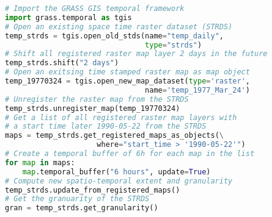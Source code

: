 \documentclass{standalone}
\begin{document}
\begin{lstlisting}[language=Python,linewidth=34.2em]
# Import the GRASS GIS temporal framework
import grass.temporal as tgis
# Open an existing space time raster dataset (STRDS)
temp_strds = tgis.open_old_stds(name="temp_daily", 
                                type="strds")
# Shift all registered raster map layer 2 days in the future
temp_strds.shift("2 days")
# Open an exitsing time stamped raster map as map object
temp_19770324 = tgis.open_new_map_dataset(type='raster', 
                                name='temp_1977_Mar_24')
# Unregister the raster map from the STRDS
temp_strds.unregister_map(temp_19770324)
# Get a list of all registered raster map layers with
# a start time later 1990-05-22 from the STRDS
maps = temp_strds.get_registered_maps_as_objects(\
                     where="start_time > '1990-05-22'")
# Create a temporal buffer of 6h for each map in the list
for map in maps:
    map.temporal_buffer("6 hours", update=True)
# Compute new spatio-temporal extent and granularity 
temp_strds.update_from_registered_maps()
# Get the granuarity of the STRDS
gran = temp_strds.get_granularity()
\end{lstlisting}
\end{document}
